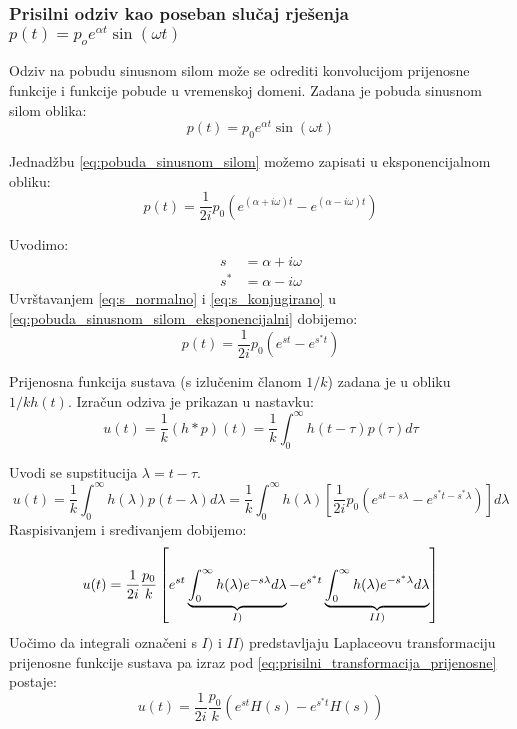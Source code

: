 \subsubsection{Prisilni odziv kao poseban slučaj rješenja $p(t)=p_oe^{\alpha
t}\sin(\omega t)$}\footnotemark {}
Odziv na pobudu sinusnom silom može se odrediti konvolucijom prijenosne funkcije i
funkcije pobude u vremenskoj domeni. Zadana je pobuda sinusnom silom oblika:
\begin{equation}\label{eq:pobuda_sinusnom_silom}
    p(t)=p_0e^{\alpha t} \sin(\omega t)
\end{equation}

Jednadžbu \eqref{eq:pobuda_sinusnom_silom} možemo zapisati u eksponencijalnom
obliku:
\begin{equation}\label{eq:pobuda_sinusnom_silom_eksponencijalni}
    p(t)=\frac{1}{2i}p_0(e^{(\alpha+i\omega)t}-e^{(\alpha-i\omega)t})
\end{equation}

Uvodimo:
\begin{align}
    s  &= \alpha + i\omega \label{eq:s_normalno}\\
    s^* &= \alpha - i\omega \label{eq:s_konjugirano}
\end{align}
Uvrštavanjem \eqref{eq:s_normalno} i \eqref{eq:s_konjugirano} u
\eqref{eq:pobuda_sinusnom_silom_eksponencijalni} dobijemo:
\begin{equation}\label{eq:pobuda_sinusnom_silom_konacno}
    p(t) = \frac{1}{2i}p_0(e^{st}-e^{s^*t})
\end{equation}

Prijenosna funkcija sustava (s izlučenim članom $1/k$) zadana je u obliku $1/k
h(t)$. Izračun odziva je prikazan u nastavku:
\[
    u(t) = \frac{1}{k}(h*p)(t) 
         = \frac{1}{k}\int_0^\infty h(t-\tau)p(\tau)d\tau
\]

Uvodi se supstitucija $\lambda=t-\tau$.
\[
    u(t) = \frac{1}{k}\int_0^\infty h(\lambda)p(t-\lambda)d\lambda
         = \frac{1}{k}\int_0^\infty h(\lambda)\left[
             \frac{1}{2i}p_0\left(e^{st-s\lambda}-e^{s^*t-s^*\lambda}\right)
             \right]d\lambda
\]
Raspisivanjem i sređivanjem dobijemo:
\begin{equation}\label{eq:prisilni_transformacija_prijenosne}
    u(t) = \frac{1}{2i}\frac{p_0}{k} \left[
                e^{st}
                \underbrace{
                    \int_0^\infty h(\lambda)e^{-s\lambda}d\lambda
                }_{\text{\textbf{$I)$}}}
                -e^{s^*t}
                \underbrace{
                    \int_0^\infty h(\lambda)e^{-s^*\lambda}d\lambda
                }_{\text{\textbf{$II)$}}}
        \right]
\end{equation}
Uočimo da integrali označeni s $I)\text{ i } II)$ predstavljaju Laplaceovu
transformaciju prijenosne funkcije sustava pa izraz pod \eqref{eq:prisilni_transformacija_prijenosne}
postaje:
\begin{equation}\label{eq:prisilni_transformacija_prijenosne_kk}
    u(t)=\frac{1}{2i}\frac{p_0}{k}(e^{st}H(s)-e^{s^*t}H(s))
\end{equation}

